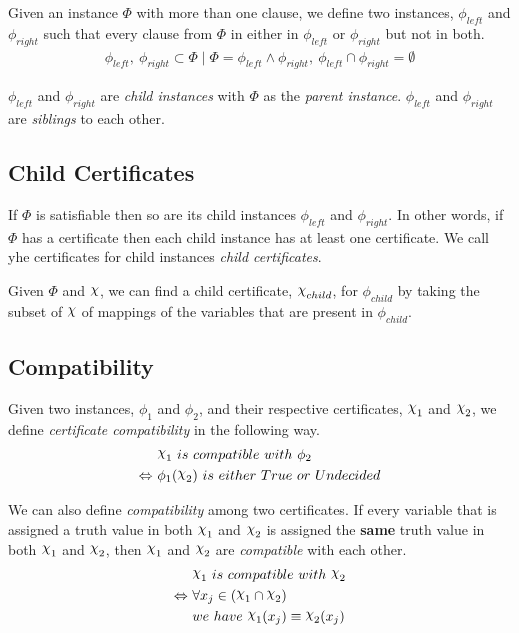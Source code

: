 Given an instance $\Phi$ with more than one clause, we define two instances, $\phi_{left}$ and $\phi_{right}$ such that every clause from $\Phi$ in either in $\phi_{left}$ or $\phi_{right}$ but not in both.
\begin{align*}
    \phi_{left},~ \phi_{right} \subset \Phi
    \mid \Phi = \phi_{left} \land \phi_{right},~
    \phi_{left} \cap \phi_{right} = \emptyset
\end{align*}

$\phi_{left}$ and $\phi_{right}$ are \textit{child instances} with $\Phi$ as the \textit{parent instance}.
$\phi_{left}$ and $\phi_{right}$ are \textit{siblings} to each other.


\subsection{Child Certificates}
\label{subsec:child-certificates}

If $\Phi$ is satisfiable then so are its child instances $\phi_{left}$ and $\phi_{right}$.
In other words, if $\Phi$ has a certificate then each child instance has at least one certificate.
We call yhe certificates for child instances \textit{child certificates}.

Given $\Phi$ and $\rchi$, we can find a child certificate, $\rchi_{child}$, for $\phi_{child}$ by taking the subset of $\rchi$ of mappings of the variables that are present in $\phi_{child}$.


\subsection{Compatibility}
\label{subsec:compatibility}

Given two instances, $\phi_1$ and $\phi_2$, and their respective certificates, $\rchi_1$ and $\rchi_2$, we define \textit{certificate compatibility} in the following way.
\begin{align*}
    & \rchi_1~ is~ compatible~ with~ \phi_2 \\
    \Leftrightarrow~ & \phi_1(\rchi_2)~ is~ either~ True~ or~ Undecided
\end{align*}

We can also define \textit{compatibility} among two certificates.
If every variable that is assigned a truth value in both $\rchi_1$ and $\rchi_2$ is assigned the \textbf{same} truth value in both $\rchi_1$ and $\rchi_2$, then $\rchi_1$ and $\rchi_2$ are \textit{compatible} with each other.
\begin{align*}
    & \rchi_1~ is~ compatible~ with~ \rchi_2 \\
    \Leftrightarrow~ & \forall x_j \in (\rchi_1 \cap \rchi_2) \\
    & we~ have~ \rchi_1(x_j) \equiv \rchi_2(x_j)
\end{align*}

